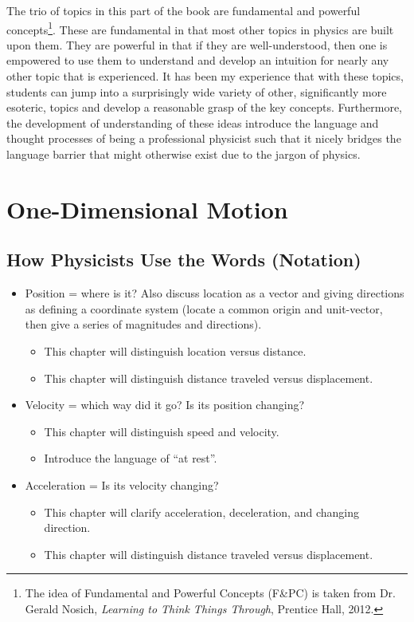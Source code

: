 \documentclass[11pt,letter,openany,makeidx]{book}
\begin{document}
The trio of topics in this part of the book are fundamental and powerful concepts\footnote{The idea of Fundamental and Powerful Concepts (F\&PC) is taken from Dr. Gerald Nosich, \textit{Learning to Think Things Through}, Prentice Hall, 2012.}.  These are fundamental in that most other topics in physics are built upon them.  They are powerful in that if they are well-understood, then one is empowered to use them to understand and develop an intuition for nearly any other topic that is experienced.  It has been my experience that with these topics, students can jump into a surprisingly wide variety of other, significantly more esoteric, topics and develop a reasonable grasp of the key concepts.  Furthermore, the development of understanding of these ideas introduce the language and thought processes of being a professional physicist such that it nicely bridges the language barrier that might otherwise exist due to the jargon of physics.

\chapter{One-Dimensional Motion}\label{c:motion}

\section{How Physicists Use the Words (Notation)}

\begin{itemize}
\item Position = where is it?  Also discuss location as a vector and giving directions as defining a coordinate system (locate a common origin and unit-vector, then give a series of magnitudes and directions).
\begin{itemize}
\item This chapter will distinguish location versus distance.
\item This chapter will distinguish distance traveled versus displacement.
\end{itemize}
\item Velocity = which way did it go?  Is its position changing?
\begin{itemize}
\item This chapter will distinguish speed and velocity.
\item Introduce the language of ``at rest''.
\end{itemize}
\item Acceleration = Is its velocity changing?
\begin{itemize}
\item This chapter will clarify acceleration, deceleration, and changing direction.
\item This chapter will distinguish distance traveled versus displacement.
\end{itemize}
\end{itemize}
\end{document}
